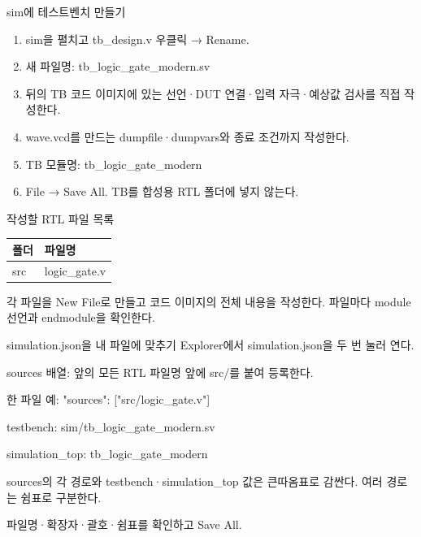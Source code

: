 \begin{frame}{sim에 테스트벤치 만들기}\relax
\small
\begin{enumerate}\setlength{\itemsep}{0.22cm}
\item sim을 펼치고 tb\_design.v 우클릭 → Rename.
\item 새 파일명: tb\_logic\_gate\_modern.sv
\item 뒤의 TB 코드 이미지에 있는 선언·DUT 연결·입력 자극·예상값 검사를 직접 작성한다.
\item wave.vcd를 만드는 dumpfile·dumpvars와 종료 조건까지 작성한다.
\item TB 모듈명: tb\_logic\_gate\_modern
\item File → Save All. TB를 합성용 RTL 폴더에 넣지 않는다.
\end{enumerate}

\end{frame}

\begin{frame}{작성할 RTL 파일 목록}\relax
\small
\begin{center}\renewcommand{\arraystretch}{1.45}
\begin{tabular}{l|l}
폴더 & 파일명\\\hline
src & logic\_gate.v\\
\end{tabular}\end{center}
각 파일을 New File로 만들고 코드 이미지의 전체 내용을 작성한다. 파일마다 module 선언과 endmodule을 확인한다.\par
\end{frame}

\begin{frame}{simulation.json을 내 파일에 맞추기}\relax
\small
Explorer에서 simulation.json을 두 번 눌러 연다.\par\vspace{0.22cm}sources 배열: 앞의 모든 RTL 파일명 앞에 src/를 붙여 등록한다.\par\vspace{0.22cm}한 파일 예: "sources": ["src/logic\_gate.v"]\par\vspace{0.22cm}testbench: sim/tb\_logic\_gate\_modern.sv\par\vspace{0.22cm}simulation\_top: tb\_logic\_gate\_modern\par\vspace{0.22cm}sources의 각 경로와 testbench·simulation\_top 값은 큰따옴표로 감싼다. 여러 경로는 쉼표로 구분한다.\par\vspace{0.22cm}파일명·확장자·괄호·쉼표를 확인하고 Save All.\par
\end{frame}

